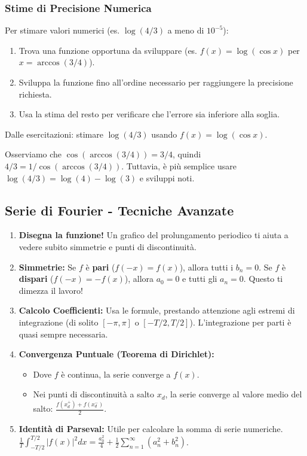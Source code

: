 \subsubsection{Stime di Precisione Numerica}

\begin{strategia}
Per stimare valori numerici (es. $\log(4/3)$ a meno di $10^{-5}$):
\begin{enumerate}
    \item Trova una funzione opportuna da sviluppare (es. $f(x) = \log(\cos x)$ per $x = \arccos(3/4)$).
    \item Sviluppa la funzione fino all'ordine necessario per raggiungere la precisione richiesta.
    \item Usa la stima del resto per verificare che l'errore sia inferiore alla soglia.
\end{enumerate}
\end{strategia}

\begin{esempio}
Dalle esercitazioni: stimare $\log(4/3)$ usando $f(x) = \log(\cos x)$.

Osserviamo che $\cos(\arccos(3/4)) = 3/4$, quindi $4/3 = 1/\cos(\arccos(3/4))$.
Tuttavia, è più semplice usare $\log(4/3) = \log(4) - \log(3)$ e sviluppi noti.
\end{esempio}

\subsection{Serie di Fourier - Tecniche Avanzate}
\begin{strategia}
\begin{enumerate}
    \item \textbf{Disegna la funzione!} Un grafico del prolungamento periodico ti aiuta a vedere subito simmetrie e punti di discontinuità. 
    \item \textbf{Simmetrie:} Se $f$ è \textbf{pari} ($f(-x)=f(x)$), allora tutti i $b_n=0$. Se $f$ è \textbf{dispari} ($f(-x)=-f(x)$), allora $a_0=0$ e tutti gli $a_n=0$. Questo ti dimezza il lavoro! 
    \item \textbf{Calcolo Coefficienti:} Usa le formule, prestando attenzione agli estremi di integrazione (di solito $[-\pi, \pi]$ o $[-T/2, T/2]$). L'integrazione per parti è quasi sempre necessaria. 
    \item \textbf{Convergenza Puntuale (Teorema di Dirichlet):}
        \begin{itemize}
            \item Dove $f$ è continua, la serie converge a $f(x)$. 
            \item Nei punti di discontinuità a salto $x_d$, la serie converge al valore medio del salto: $\frac{f(x_d^+) + f(x_d^-)}{2}$. 
        \end{itemize}
    \item \textbf{Identità di Parseval:} Utile per calcolare la somma di serie numeriche. $\frac{1}{T} \int_{-T/2}^{T/2} |f(x)|^2 dx = \frac{a_0^2}{4} + \frac{1}{2} \sum_{n=1}^\infty (a_n^2 + b_n^2)$. 
\end{enumerate}
\end{strategia}

